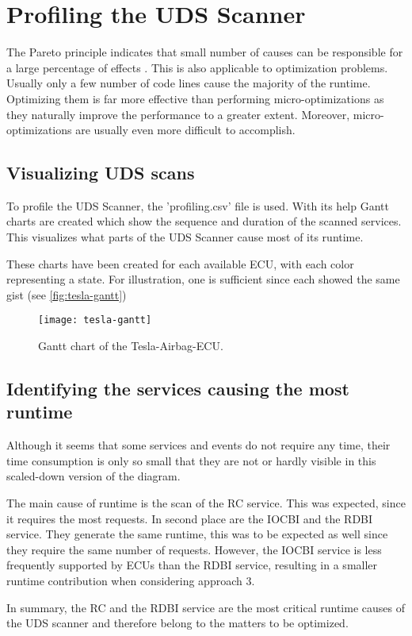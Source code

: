 \section{Profiling the UDS Scanner}

The Pareto principle indicates that small number of causes can be responsible for a large percentage of effects \cite{pareto}. This is also applicable to optimization problems. Usually only a few number of code lines cause the majority of the runtime. Optimizing them is far more effective than performing micro-optimizations as they naturally improve the performance to a greater extent. Moreover, micro-optimizations are usually even more difficult to accomplish.

\subsection{Visualizing UDS scans}

To profile the UDS Scanner, the 'profiling.csv' file is used. With its help Gantt charts are created which show the sequence and duration of the scanned services. This visualizes what parts of the UDS Scanner cause most of its runtime.

These charts have been created for each available ECU, with each color representing a state. For illustration, one is sufficient since each showed the same gist (see \autoref{fig:tesla-gantt})

\begin{figure}[H]
    \centering
    \texttt{[image: tesla-gantt]}
    \caption{Gantt chart of the Tesla-Airbag-ECU.}
    \label{fig:tesla-gantt}
\end{figure}


\subsection{Identifying the services causing the most runtime}

Although it seems that some services and events do not require any time, their time consumption is only so small that they are not or hardly visible in this scaled-down version of the diagram.

The main cause of runtime is the scan of the RC service. This was expected, since it requires the most requests.
In second place are the IOCBI and the RDBI service. They generate the same runtime, this was to be expected as well since they require the same number of requests. However, the IOCBI service is less frequently supported by ECUs than the RDBI service, resulting in a smaller runtime contribution when considering approach 3.

In summary, the RC and the RDBI service are the most critical runtime causes of the UDS scanner and therefore belong to the matters to be optimized.
